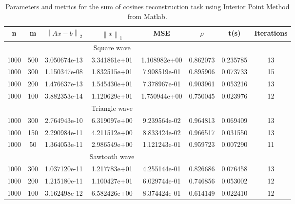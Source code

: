 \documentclass[journal,article,submit,electronics,pdftex]{Definitions/mdpi}
\newcommand{\norm}[1]{\left\lVert#1\right\rVert}
\begin{document}
{\section{}
\begin{table}[htb]
    \centering
    \caption{Parameters and metrics for the sum of cosines reconstruction task using Interior Point Method from Matlab.}
    \begin{tabular}{@{}cccccccc@{}}
        \toprule
        n & m & $\norm{Ax-b}_2$ & $\norm{x}_1$ & MSE & $\rho$ & t(s) & Iterations \\
        \midrule
        & &  & Square wave & & \\
        \bottomrule
        1000 & 500 & 3.050674e-13 & 3.341861e+01 & 1.108982e+00 & 0.862073 & 0.235785 & 13 \\
        1000 & 300 & 1.150347e-08 & 1.832515e+01 & 7.908519e-01 & 0.895906 & 0.073733 & 15 \\
        1000 & 200 & 1.476637e-13 & 1.545430e+01 & 7.378967e-01 & 0.903961 & 0.053216 & 13 \\
        1000 & 100 & 3.882353e-14 & 1.120629e+01 & 1.750944e+00 & 0.750045 & 0.023976 & 12 \\
        \bottomrule
        & &  & Triangle wave & \\
        \bottomrule
        1000 & 300 & 2.764943e-10 & 6.319097e+00 & 9.239564e-02 & 0.964813 & 0.069409 & 13 \\
        1000 & 150 & 2.290984e-11 & 4.211512e+00 & 8.833424e-02 & 0.966517 & 0.031550 & 13 \\
        1000 &  50 & 1.364053e-11 & 2.986549e+00 & 1.121243e-01 & 0.959723 & 0.007290 & 11 \\
        \bottomrule
        & &  & Sawtooth wave & \\
        \bottomrule
        1000 & 300 & 1.037120e-11 & 1.217783e+01 & 4.255144e-01 & 0.826686 & 0.076458 & 13 \\
        1000 & 200 & 1.215180e-11 & 1.100427e+01 & 6.029744e-01 & 0.746856 & 0.053002 & 12 \\
        1000 & 100 & 3.162498e-12 & 6.582426e+00 & 8.374424e-01 & 0.614149 & 0.022410 & 12 \\
        \bottomrule
    \end{tabular}
    \label{tab:IPM_res}
\end{table}

}
\end{document}
